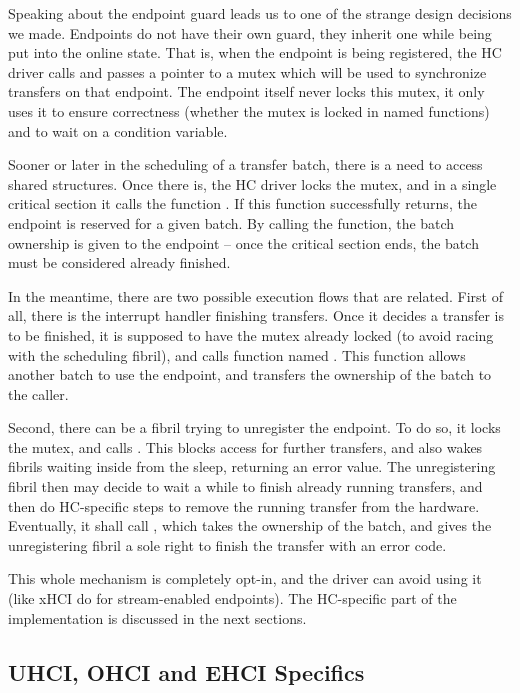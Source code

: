 Speaking about the endpoint guard leads us to one of the strange design
decisions we made. Endpoints do not have their own guard, they inherit one
while being put into the online state. That is, when the endpoint is being
registered, the HC driver calls  and passes a pointer
to a mutex which will be used to synchronize transfers on that endpoint. The
endpoint itself never locks this mutex, it only uses it to ensure correctness
(whether the mutex is locked in named functions) and to wait on a condition
variable.

Sooner or later in the scheduling of a transfer batch, there is a need to access
shared structures. Once there is, the HC driver locks the mutex, and in a single
critical section it calls the function . If this
function successfully returns, the endpoint is reserved for a given batch. By
calling the function, the batch ownership is given to the endpoint -- once the
critical section ends, the batch must be considered already finished.

In the meantime, there are two possible execution flows that are related. First
of all, there is the interrupt handler finishing transfers. Once it decides
a transfer is to be finished, it is supposed to have the mutex already locked
(to avoid racing with the scheduling fibril), and calls function named
. This function allows another batch to use the
endpoint, and transfers the ownership of the batch to the caller.

Second, there can be a fibril trying to unregister the endpoint. To do so, it
locks the mutex, and calls . This blocks access for
further transfers, and also wakes fibrils waiting inside
 from the sleep, returning an error value. The
unregistering fibril then may decide to wait a while to finish already running
transfers, and then do HC-specific steps to remove the running transfer from the
hardware. Eventually, it shall call , which
takes the ownership of the batch, and gives the unregistering fibril a sole
right to finish the transfer with an error code.

This whole mechanism is completely opt-in, and the driver can avoid using it
(like xHCI do for stream-enabled endpoints). The HC-specific part of the
implementation is discussed in the next sections.

\subsection{UHCI, OHCI and EHCI Specifics}

